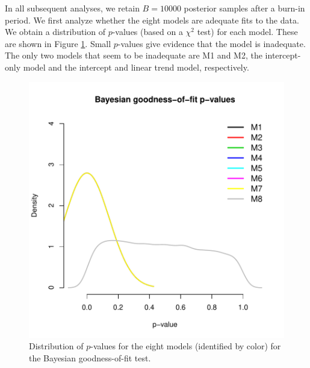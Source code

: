 \documentclass{asaproc}
\begin{document}
In all subsequent analyses, we retain $B=10000$ posterior samples after a burn-in period. We first analyze whether the eight models are adequate fits to the data. We obtain a distribution of $p$-values (based on a $\chi^2$ test) for each model. These are shown in Figure \ref{gof}. Small $p$-values give evidence that the model is inadequate. The only two models that seem to be inadequate are M1 and M2, the intercept-only model and the intercept and linear trend model, respectively.
\begin{figure}
\centering
\includegraphics[scale=0.55]{figs/gof.pdf}
\caption{Distribution of $p$-values for the eight models (identified by color) for the Bayesian goodness-of-fit test.}
\label{gof}
\end{figure}
\end{document}
